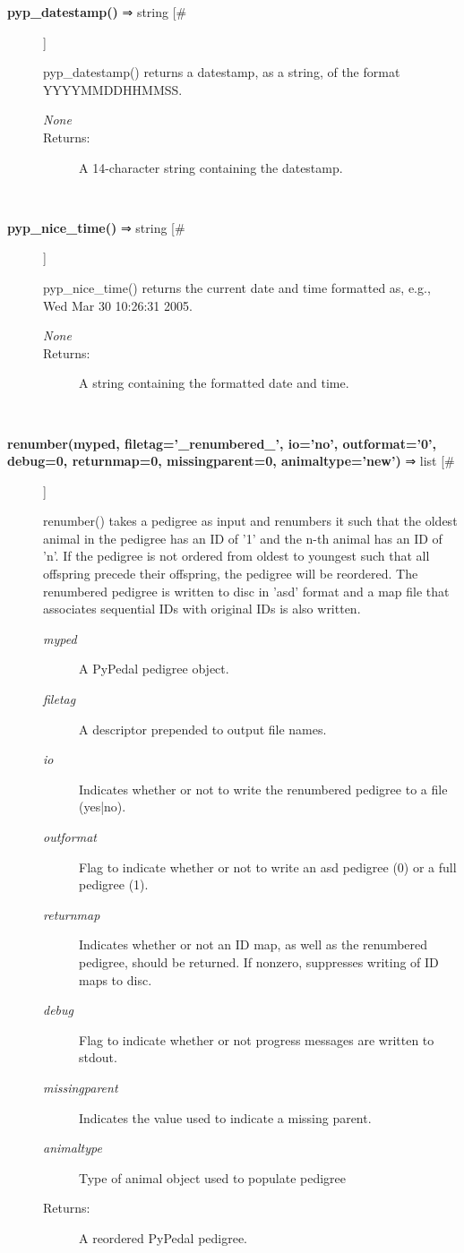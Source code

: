 \begin{description}
\item[\textbf{pyp\_datestamp()} ⇒ string [\#]
]
\par pyp\_datestamp() returns a datestamp, as a string, of the format
YYYYMMDDHHMMSS.
\begin{description}
\item[\textit{None}
]

\item[Returns:
]
A 14-character string containing the datestamp.
\end{description}\\

\item[\textbf{pyp\_nice\_time()} ⇒ string [\#]
]
\par pyp\_nice\_time() returns the current date and time formatted as, e.g.,
Wed Mar 30 10:26:31 2005.
\begin{description}
\item[\textit{None}
]

\item[Returns:
]
A string containing the formatted date and time.
\end{description}\\

\item[\textbf{renumber(myped, filetag='\_renumbered\_', io='no', outformat='0', debug=0, returnmap=0, missingparent=0, animaltype='new')} ⇒ list [\#]
]
\par renumber() takes a pedigree as input and renumbers it such that the oldest
animal in the pedigree has an ID of '1' and the n-th animal has an ID of 'n'.  If the
pedigree is not ordered from oldest to youngest such that all offspring precede their
offspring, the pedigree will be reordered.  The renumbered pedigree is written to disc in
'asd' format and a map file that associates sequential IDs with original IDs is also
written.
\begin{description}
\item[\textit{myped}
]
A PyPedal pedigree object.
\item[\textit{filetag}
]
A descriptor prepended to output file names.
\item[\textit{io}
]
Indicates whether or not to write the renumbered pedigree to a file (yes|no).
\item[\textit{outformat}
]
Flag to indicate whether or not to write an asd pedigree (0) or a full pedigree (1).
\item[\textit{returnmap}
]
Indicates whether or not an ID map, as well as the renumbered pedigree, should be returned.  If nonzero, suppresses writing of ID maps to disc.
\item[\textit{debug}
]
Flag to indicate whether or not progress messages are written to stdout.
\item[\textit{missingparent}
]
Indicates the value used to indicate a missing parent.
\item[\textit{animaltype}
]
Type of animal object used to populate pedigree
\item[Returns:
]
A reordered PyPedal pedigree.
\end{description}\\


\end{description}
